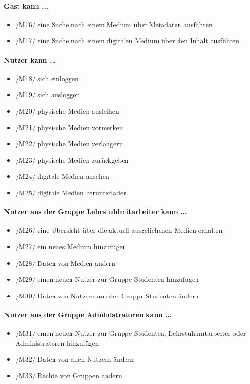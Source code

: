 \documentclass[12pt, a4paper]{article}
\begin{document}
\paragraph{Gast kann ...}
\begin{itemize}
	\item /M16/ eine Suche nach einem Medium über Metadaten ausführen
	\item /M17/ eine Suche nach einem digitalen Medium über den Inhalt ausführen
\end{itemize}
\paragraph{Nutzer kann ...}
\begin{itemize} 
	\item /M18/ sich einloggen
	\item /M19/ sich ausloggen
	\item /M20/ physische Medien ausleihen 
	\item /M21/ physische Medien vormerken 
	\item /M22/ physische Medien verlängern 
	\item /M23/ physische Medien zurückgeben
	\item /M24/ digitale Medien ansehen 
	\item /M25/ digitale Medien herunterladen 
\end{itemize}	
\paragraph{Nutzer aus der Gruppe Lehrstuhlmitarbeiter kann ...}
\begin{itemize}
	\item /M26/ eine Übersicht über die aktuell ausgeliehenen Medien erhalten
	\item /M27/ ein neues Medium hinzufügen
	\item /M28/ Daten von Medien ändern  
	\item /M29/ einen neuen Nutzer zur Gruppe Studenten hinzufügen
	\item /M30/ Daten von Nutzern aus der Gruppe Studenten ändern
\end{itemize}	
\paragraph{Nutzer aus der Gruppe Administratoren kann ...}
\begin{itemize}
	\item /M31/ einen neuen Nutzer zur Gruppe Studenten, Lehrstuhlmitarbeiter oder Administratoren hinzufügen
	\item /M32/ Daten von allen Nutzern ändern
	\item /M33/ Rechte von Gruppen ändern  	 	
\end{itemize}	
\end{document}
